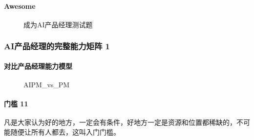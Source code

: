 \documentclass[letterpaper,10pt,english]{sphinxmanual}
\begin{document}
\paragraph{Awesome}
\label{\detokenize{chapter_introduction/AI_PM:id45}}

\begin{figure}[H]
\centering
\capstart

\noindent{}
\caption{成为AI产品经理测试题\sphinxfootnotemark[314]}\label{\detokenize{chapter_introduction/AI_PM:id66}}\end{figure}
%
\begin{footnotetext}[314]\sphinxAtStartFootnote
{}
%
\end{footnotetext}\ignorespaces 

\subsubsection{AI产品经理的完整能力矩阵 1\sphinxfootnotemark[315]}
\label{\detokenize{chapter_introduction/ability:ai-1}}\label{\detokenize{chapter_introduction/ability::doc}}%
\begin{footnotetext}[315]\sphinxAtStartFootnote
{}
%
\end{footnotetext}\ignorespaces 

\paragraph{对比产品经理能力模型}
\label{\detokenize{chapter_introduction/ability:id1}}
\begin{figure}[H]
\centering
\capstart

\noindent{}
\caption{AIPM\_vs\_PM}\label{\detokenize{chapter_introduction/ability:id19}}\end{figure}


\paragraph{门槛 11\sphinxfootnotemark[316]}
\label{\detokenize{chapter_introduction/ability:id2}}%
\begin{footnotetext}[316]\sphinxAtStartFootnote
{}
%
\end{footnotetext}\ignorespaces 
凡是大家认为好的地方，一定会有条件，好地方一定是资源和位置都稀缺的，不可能随便让所有人都去，这叫入门门槛。
\end{document}
